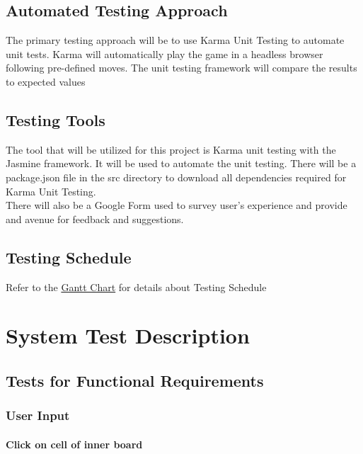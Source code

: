 \documentclass[12pt, titlepage]{article}
\begin{document}
\subsection{Automated Testing Approach}
The primary testing approach will be to use Karma Unit Testing to automate unit
tests. Karma will automatically play the game in a headless browser following
pre-defined moves. The unit testing framework will compare the results to
expected values

\subsection{Testing Tools}
The tool that will be utilized for this project is Karma unit testing with the
Jasmine framework. It will be used to automate the unit testing. There will be a
package.json file in the src directory to download all dependencies required for
Karma Unit Testing.\\
There will also be a Google Form used to survey user's experience and provide
and avenue for feedback and suggestions.

\subsection{Testing Schedule}	
Refer to the \href{run:../../ProjectSchedule/Gantt Chart.gan}{Gantt Chart} for
details about Testing Schedule

\section{System Test Description}
	
\subsection{Tests for Functional Requirements}

\subsubsection{User Input}
		
\paragraph{Click on cell of inner board}
\end{document}
